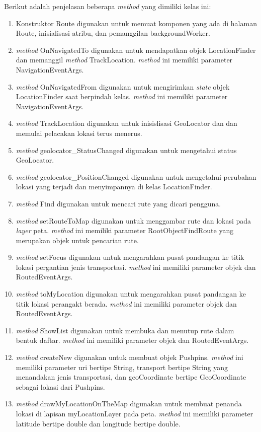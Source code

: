 Berikut adalah penjelasan beberapa \textit{method} yang dimiliki kelas ini:
\begin{enumerate}
	\item Konstruktor Route digunakan untuk memuat komponen yang ada di halaman Route, inisialisasi atribu, dan pemanggilan backgroundWorker.
	\item \textit{method} OnNavigatedTo digunakan untuk mendapatkan objek LocationFinder dan memanggil \textit{method} TrackLocation. \textit{method} ini memiliki parameter NavigationEventArgs.
	\item \textit{method} OnNavigatedFrom digunakan untuk mengirimkan \textit{state} objek LocationFinder saat berpindah kelas. \textit{method} ini memiliki parameter NavigationEventArgs.
	\item \textit{method} TrackLocation digunakan untuk inisislisasi GeoLocator dan dan memulai pelacakan lokasi terus menerus. 
	\item \textit{method} geolocator\_StatusChanged digunakan untuk mengetahui status GeoLocator.
	\item \textit{method} geolocator\_PositionChanged digunakan untuk mengetahui perubahan lokasi yang terjadi dan menyimpannya di kelas LocationFinder.
	\item \textit{method} Find digunakan untuk mencari rute yang dicari pengguna.
	\item \textit{method} setRouteToMap digunakan untuk menggambar rute dan lokasi pada \textit{layer} peta. \textit{method} ini memiliki parameter RootObjectFindRoute yang merupakan objek untuk pencarian rute.
	\item \textit{method} setFocus digunakan untuk mengarahkan pusat pandangan ke titik lokasi pergantian jenis transportasi. \textit{method} ini memiliki parameter objek dan RoutedEventArgs.
	\item \textit{method} toMyLocation digunakan untuk mengarahkan pusat pandangan ke titik lokasi perangakt berada. \textit{method} ini memiliki parameter objek dan RoutedEventArgs.
	\item \textit{method} ShowList digunakan untuk membuka dan menutup rute dalam bentuk daftar. \textit{method} ini memiliki parameter objek dan RoutedEventArgs.
	\item \textit{method} createNew digunakan untuk membuat objek Pushpins. \textit{method} ini memiliki parameter uri bertipe String, transport bertipe String yang menandakan jenis transportasi, dan geoCoordinate bertipe GeoCoordinate sebagai lokasi dari Pushpins.
	\item \textit{method} drawMyLocationOnTheMap digunakan untuk membuat penanda lokasi di lapisan myLocationLayer pada peta. \textit{method} ini memiliki parameter latitude bertipe double dan longitude bertipe double.

\end{enumerate}
